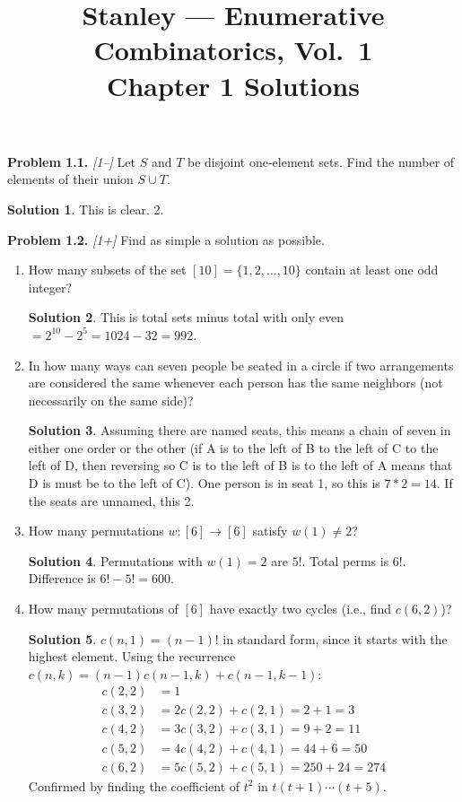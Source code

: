 \documentclass[11pt]{article}
\title{Stanley --- Enumerative Combinatorics, Vol.\ 1\\
       \large Chapter 1 Solutions}
\author{}
\date{}
\theoremstyle{definition}
\newtheorem*{solution}{Solution}
\newcounter{probnum}
\newcommand{\problem}[1]{%
  \setcounter{probnum}{#1}%
  \medskip
  \noindent\textbf{Problem 1.#1.}\quad
}
\begin{document}
\maketitle

\problem{1} \textit{[1--]}
Let $S$ and $T$ be disjoint one-element sets.
Find the number of elements of their union $S \cup T$.

\begin{solution}

This is clear.  2.

\end{solution}

\problem{2} \textit{[1+]}
Find as simple a solution as possible.

\begin{enumerate}[label=(\alph*)]
  \item How many subsets of the set $[10] = \{1,2,\ldots,10\}$ contain at least one odd integer?
    \begin{solution}
    This is total sets minus total with only even $= 2^{10} - 2^5 = 1024 - 32 = 992.$
    \end{solution}

  \item In how many ways can seven people be seated in a circle if two arrangements are
    considered the same whenever each person has the same neighbors (not necessarily
    on the same side)?
    \begin{solution}
    Assuming there are named seats, this means a chain of seven in either one order or the other (if A is to the left of B to the left of C to the left of D, then reversing so C is to the left of B is to the left of A means that D is must be to the left of C).  One person is in seat 1, so this is $7*2 = 14$.  If the seats are unnamed, this 2.
    \end{solution}

  \item How many permutations $w:[6]\to[6]$ satisfy $w(1)\neq 2$?
    \begin{solution}
    Permutations with $w(1) = 2$ are $5!$.  Total perms is $6!$.  Difference is $6! - 5! = 600$.
    \end{solution}

  \item How many permutations of $[6]$ have exactly two cycles (i.e., find $c(6,2)$)?
    \begin{solution}
    $c(n,1) = (n-1)!$ in standard form, since it starts with the highest element.
    Using the recurrence $c(n,k) = (n-1)c(n-1,k) + c(n-1,k-1)$:
    \begin{align*}
      c(2,2) &= 1 \\
      c(3,2) &= 2c(2,2) + c(2,1) = 2 + 1 = 3 \\
      c(4,2) &= 3c(3,2) + c(3,1) = 9 + 2 = 11 \\
      c(5,2) &= 4c(4,2) + c(4,1) = 44 + 6 = 50 \\
      c(6,2) &= 5c(5,2) + c(5,1) = 250 + 24 = 274
    \end{align*}
    Confirmed by finding the coefficient of $t^2$ in $t(t+1)\cdots(t+5)$.
    \end{solution}


\end{enumerate}
\end{document}
